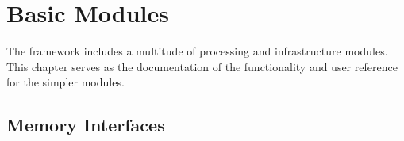 







\chapter{Basic Modules} \label{ch:07-modules}

The \asterics framework includes a multitude of processing and infrastructure modules.
This chapter serves as the documentation of the functionality and user reference for the simpler \asterics modules.


%
%
%
%
%


\section{Memory Interfaces}\label{ch:07-basic_mods-memory}

